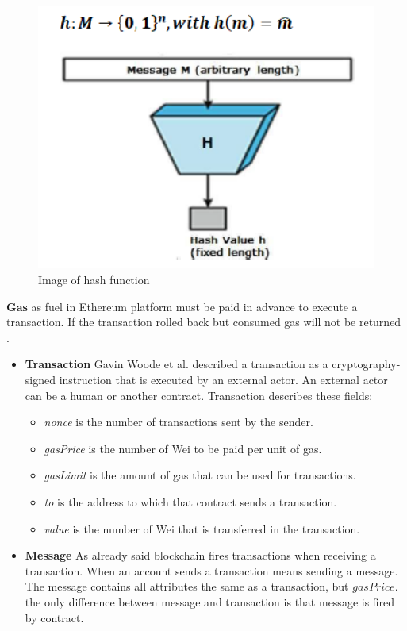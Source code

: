 \begin{center}
	\begin{figure}[htb!]
		
		\begin{minipage}{0.2\linewidth}
			\centering
			\includegraphics[width=4.5\textwidth]{images/chap01_hash_function.png}
		\end{minipage}
		\caption[Image of hash function]{Image of hash function \cite{Fips}}
		
	\end{figure}
	
\end{center}
\textbf{Gas} as fuel in Ethereum platform must be paid in advance to execute a transaction. If the transaction rolled back but consumed gas will not be returned \cite{Egbertsen}.\\
\begin{itemize}
    \item \textbf{Transaction}
     Gavin Woode et al. \cite{Gavin} described a transaction as a cryptography-signed instruction that is executed by an external actor. An external actor can be a human or another contract. Transaction describes these fields:
     \begin{itemize}
         \item \textit{nonce} is the number of transactions sent by the sender.
         \item \textit{gasPrice} is the number of Wei to be paid per unit of gas.
         \item \textit{gasLimit} is the amount of gas that can be used for transactions.
         \item \textit{to} is the address to which that contract sends a transaction.
         \item \textit{value} is the number of Wei that is transferred in the transaction.
     \end{itemize}
        \item \textbf{Message}
        As already said blockchain fires transactions when receiving a transaction. When an account sends a transaction means sending a message. The message contains all attributes the same as a transaction, but $gasPrice$. the only difference between message and transaction is that message is fired by contract\cite{Egbertsen}.
\end{itemize}
